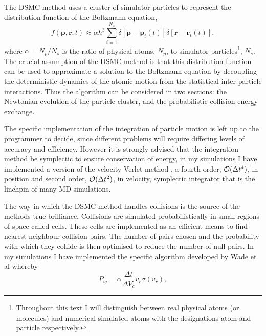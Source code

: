 The DSMC method uses a cluster of simulator particles to represent the distribution function of the Boltzmann equation,
\begin{equation*}
    f(\mathbf{p},\mathbf{r},t) \approx \alpha h^3 \sum_{i=1}^{N_s}\delta\left[\mathbf{p}-\mathbf{p}_i(t)\right]\delta\left[\mathbf{r}-\mathbf{r}_i(t)\right],
\end{equation*}
where $\alpha = N_p / N_s$ is the ratio of physical atoms, $N_p$, to simulator particles\footnote{Throughout this text I will distinguish between real physical atoms (or molecules) and numerical simulated atoms with the designations atom and particle respectively.}, $N_s$.
The crucial assumption of the DSMC method is that this distribution function can be used to approximate a solution to the Boltzmann equation by decoupling the deterministic dynamics of the atomic motion from the statistical inter-particle interactions.
Thus the algorithm can be considered in two sections: the Newtonian evolution of the particle cluster, and the probabilistic collision energy exchange.

The specific implementation of the integration of particle motion is left up to the programmer to decide, since different problems will require differing levels of accuracy and efficiency.
However it is strongly advised that the integration method be symplectic to ensure conservation of energy, in my simulations I have implemented a version of the velocity Verlet method \cite{verlet1967}, a fourth order, ${\cal O}(\Delta t^4)$, in position and second order, ${\cal O}(\Delta t^2)$, in velocity, symplectic integrator that is the linchpin of many MD simulations. 

The way in which the DSMC method handles collisions is the source of the methods true brilliance.
Collisions are simulated probabilistically in small regions of space called cells.
These cells are implemented as an efficient means to find nearest neighbour collision pairs.
The number of pairs chosen and the probability with which they collide is then optimised to reduce the number of null pairs.
In my simulations I have implemented the specific algorithm developed by Wade et al \cite{Wade2011} whereby
\begin{equation}
    P_{ij} = \alpha \frac{\Delta t}{\Delta V_c} v_r \sigma(v_r),
\end{equation}

